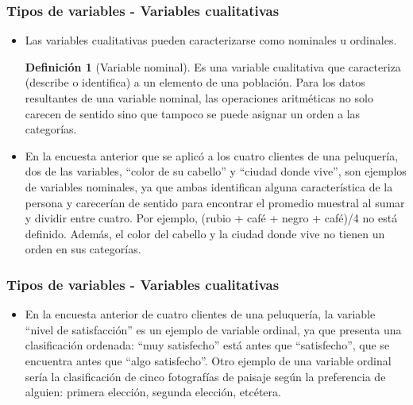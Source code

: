 \documentclass[10pt]{beamer}
\theoremstyle{plain} %
\theoremstyle{definition}
\newtheorem{defn}{Definición}
\theoremstyle{remark}
\begin{document}
\begin{frame}
\frametitle{Tipos de variables - Variables cualitativas}
\begin{itemize}[<+->]
\justifying
\item Las variables cualitativas pueden caracterizarse como nominales u ordinales.

\begin{defn}[Variable nominal]
Es una variable cualitativa que caracteriza (describe o identifica) a un elemento de una población. Para los datos resultantes de una variable nominal, las operaciones aritméticas no solo carecen de sentido sino que tampoco se puede asignar un orden a las categorías.
\end{defn}
\item En la encuesta anterior que se aplicó a los cuatro clientes de una peluquería, dos de las variables, ``color de su cabello'' y ``ciudad donde vive'', son ejemplos de variables nominales, ya que ambas identifican alguna característica de la persona y carecerían de sentido para encontrar el promedio muestral al sumar y dividir entre cuatro. Por ejemplo, (rubio + café + negro + café)/4 no está definido. Además, el color del cabello y la ciudad donde vive no tienen un orden en sus categorías.
\end{itemize}
\end{frame}

\begin{frame}
\frametitle{Tipos de variables - Variables cualitativas}
\begin{itemize}[<+->]
\justifying

\begin{defn}[Variable ordinal]
es una variable cualitativa que presenta una posición, o clasificación, ordenada.
\end{defn}
\item En la encuesta anterior de cuatro clientes de una peluquería, la variable ``nivel de satisfacción'' es un ejemplo de variable ordinal, ya que presenta una clasificación ordenada: ``muy satisfecho'' está antes que ``satisfecho'', que se encuentra antes que ``algo satisfecho''. Otro ejemplo de una variable ordinal sería la clasificación de cinco fotografías de paisaje según la preferencia de alguien: primera elección, segunda elección, etcétera.
\end{itemize}
\end{frame}
\end{document}
